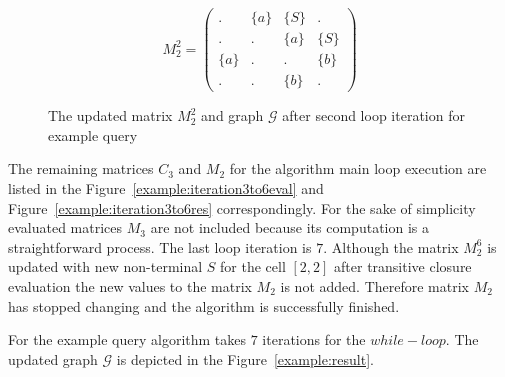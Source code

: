 \begin{figure}
    \begin{subfigure}[]{0.5\textwidth}
    \centering
    $$
    M_2^2 =
    \begin{pmatrix}
    .     & \{a\} & \{S\} & .     \\
    .     & .     & \{a\} & \{S\} \\
    \{a\} & .     & .     & \{b\} \\
    .     & .     & \{b\} & .
    \end{pmatrix}
    $$
    \end{subfigure}
    \begin{subfigure}[]{0.4\textwidth}
    \centering
    \end{subfigure}
    \caption{The updated matrix $M_2^2$ and graph $\mathcal{G}$ after second loop iteration for example query}
    \label{example:iteration2res}
\end{figure}

The remaining matrices $C_3$ and $M_2$ for the algorithm main loop execution are listed in the Figure~\ref{example:iteration3to6eval} and Figure~\ref{example:iteration3to6res} correspondingly. For the sake of simplicity evaluated matrices $M_3$ are not included because its computation is a straightforward process. The last loop iteration is $7$. Although the matrix $M_2^6$ is updated with new non-terminal $S$ for the cell $[2,2]$ after transitive closure evaluation the new values to the matrix $M_2$ is not added. Therefore matrix $M_2$ has stopped changing and the algorithm is successfully finished.

For the example query algorithm takes $7$ iterations for the $while-loop$. The updated graph $\mathcal{G}$ is depicted in the Figure~\ref{example:result}.

